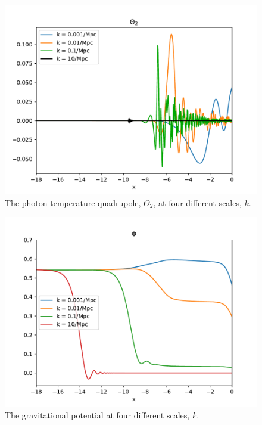 \documentclass{aa}
\begin{document}
\begin{figure}[h!]
   \includegraphics[scale=0.65]{../figures/milestone3/theta_2.pdf}
   \caption{The photon temperature quadrupole, $\Theta_2$, at four different scales, $k$.}\label{fig:theta2}
\end{figure}

\begin{figure}[h!]
   \includegraphics[scale=0.6]{../figures/milestone3/phi.pdf}
   \caption{The gravitational potential at four different scales, $k$.}\label{fig:phi}
\end{figure}
\end{document}
